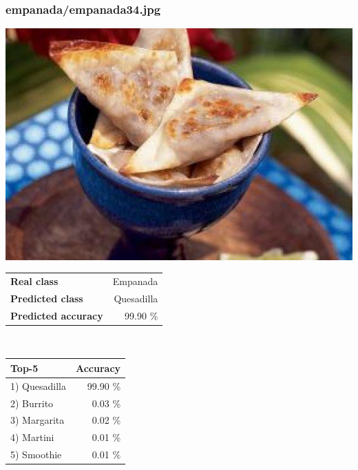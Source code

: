 \subsubsection{empanada/empanada34.jpg}

\begin{minipage}[t]{0.4\textwidth}
	\vspace{0pt}
	\includegraphics[width=\linewidth]{images/evaluation-images/empanada/empanada34.jpg}
\end{minipage}
\hfill
\begin{minipage}[t]{0.5\textwidth}
	\vspace{0pt}\raggedright
	\begin{tabularx}{\textwidth}{X r}
		\small \textbf{Real class} & \small Empanada\\
		\small \textbf{Predicted class} & \small Quesadilla\\
		\small \textbf{Predicted accuracy} & \small 99.90 \%
    \end{tabularx}\\
    
    \vspace{6pt}
	\begin{tabularx}{\textwidth}{X r}
        \small \textbf{Top-5} & \small \textbf{Accuracy} \\
        \hline
		\small 1) Quesadilla & \small 99.90 \%\\\small 2) Burrito & \small 0.03 \%\\\small 3) Margarita & \small 0.02 \%\\\small 4) Martini & \small 0.01 \%\\\small 5) Smoothie & \small 0.01 \%
    \end{tabularx}
\end{minipage}
    
